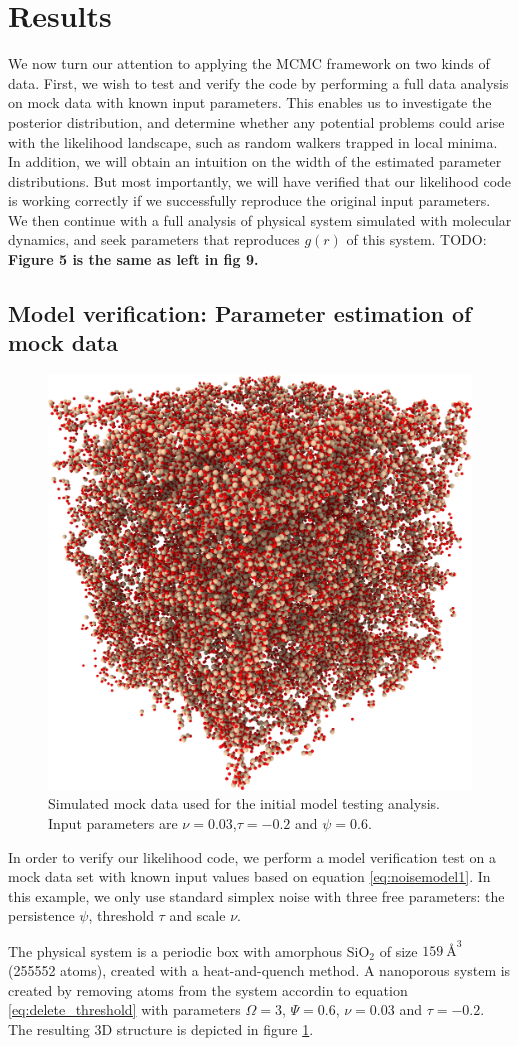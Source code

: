 \documentclass[aps,pre,twocolumn,letterpaper,floatfix,showpacs]{revtex4}
\newcommand{\todo}[1]{ {\color{Magenta} TODO: \color{Blue} \textbf{#1} }}
\begin{document}
\section{Results}
We now turn our attention to applying the MCMC framework on two kinds of data.
First, we wish to test and verify the code by performing a full data analysis on
mock data with known input parameters. This enables us to investigate the posterior
distribution, and determine whether any potential problems could arise with the
likelihood landscape, such as random walkers trapped in local minima. In addition,
we will obtain an intuition on the width of the estimated parameter distributions.
But most importantly, we will have verified that our likelihood code is working correctly
if we successfully reproduce the original input parameters. We then continue with a
full analysis of physical system simulated with molecular dynamics, and seek parameters that reproduces $g(r)$ of this system.
\todo{Figure 5 is the same as left in fig 9.}
\subsection{Model verification: Parameter estimation of mock data}
\begin{figure}[htb!]
\includegraphics[width=.45\textwidth]{model_test.png}
\caption{Simulated mock data used for the initial model testing analysis. Input parameters are $\nu=0.03$,$\tau=-0.2$ and $\psi=0.6$.}
\label{fig:mockdata}
\end{figure}
In order to verify our likelihood code, we perform a model verification test
on a mock data set with known input values based on equation \ref{eq:noisemodel1}.
In this example, we only use standard simplex noise with three free parameters:
the persistence $\psi$, threshold $\tau$ and scale $\nu$. 

The physical system is a periodic box with amorphous SiO$_2$ of size $\SI{159} {\angstrom}^3$ (255552 atoms), created with a heat-and-quench method.
A nanoporous system is created by removing atoms from the system accordin to equation \eqref{eq:delete_threshold} with parameters $\Omega=3$, $\Psi = 0.6$, $\nu=0.03$ and $\tau=-0.2$.
The resulting 3D structure is depicted in figure \ref{fig:mockdata}. 
\end{document}
